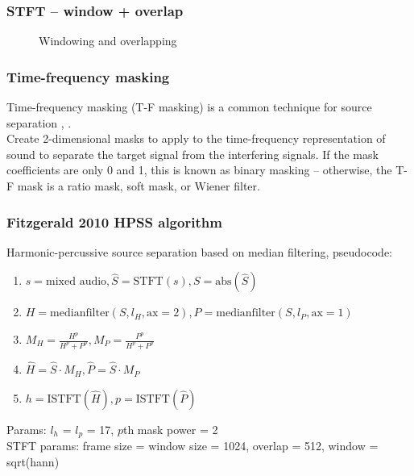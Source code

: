 \documentclass{beamer}
\begin{document}
\begin{frame}
	\frametitle{STFT -- window + overlap}
	\begin{figure}
		\hspace{0.2em}
		\caption{Windowing and overlapping}
	\end{figure}
\end{frame}

\begin{frame}
	\frametitle{Time-frequency masking}

Time-frequency masking (T-F masking) is a common technique for source separation , .\\
	Create 2-dimensional masks to apply to the time-frequency representation of sound to separate the target signal from the interfering signals. If the mask coefficients are only 0 and 1, this is known as binary masking -- otherwise, the T-F mask is a ratio mask, soft mask, or Wiener filter.
\end{frame}

\begin{frame}
	\frametitle{Fitzgerald 2010 HPSS algorithm}
	Harmonic-percussive source separation based on median filtering, pseudocode:
	\vspace{0.75em}
	\begin{enumerate}
		\item $ s = \text{mixed audio}, \hat{S} = \text{STFT}(s), S = \text{abs}(\hat{S}) $
		\item $ H = \text{medianfilter}(S, l_{H}, \text{ax}=2), P = \text{medianfilter}(S, l_{P}, \text{ax}=1) $
		\item $ M_{H} = \frac{H^{p}}{H^{p} + P^{p}}, M_{P} = \frac{P^{p}}{H^{p} + P^{p}} $
		\item $ \hat{H} = \hat{S} \cdot M_{H}, \hat{P} = \hat{S} \cdot M_{P} $
		\item $ h = \text{ISTFT}(\hat{H}), p = \text{ISTFT}(\hat{P}) $
	\end{enumerate}
	Params: $l_{h}$ = $l_{p}$ = 17, $p$th mask power = 2\\
	STFT params: frame size = window size = 1024, overlap = 512, window = sqrt(hann)
\end{frame}
\end{document}
